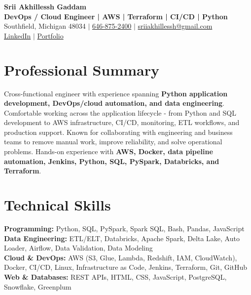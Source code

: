 \documentclass[letterpaper,10pt]{article}
\begin{document}
\fontsize{9.35pt}{10.45pt}\selectfont

\begin{center}
    {\LARGE \textbf{Srii Akhillessh Gaddam}} \\[-1pt]
    \textbf{DevOps / Cloud Engineer | AWS | Terraform | CI/CD | Python} \\[2pt]
    Southfield, Michigan 48034 $|$
    \href{tel:6468752400}{646-875-2400} $|$
    \href{mailto:sriiakhillessh@gmail.com}{sriiakhillessh@gmail.com} \\[1pt]
    \href{https://www.linkedin.com/in/srii-akhiilessh-gaddam-b48668191/}{LinkedIn} $|$
    \href{https://sriiakhillesshg.github.io/portfolio/}{Portfolio}
\end{center}
\vspace{-8pt}

\section{Professional Summary}
\small{Cross-functional engineer with experience spanning \textbf{Python application development, DevOps/cloud automation, and data engineering}. Comfortable working across the application lifecycle - from Python and SQL development to AWS infrastructure, CI/CD, monitoring, ETL workflows, and production support. Known for collaborating with engineering and business teams to remove manual work, improve reliability, and solve operational problems. Hands-on experience with \textbf{AWS, Docker, data pipeline automation, Jenkins, Python, SQL, PySpark, Databricks, and Terraform}.}

\section{Technical Skills}
\small{
\textbf{Programming:} Python, SQL, PySpark, Spark SQL, Bash, Pandas, JavaScript \\
\textbf{Data Engineering:} ETL/ELT, Databricks, Apache Spark, Delta Lake, Auto Loader, Airflow, Data Validation, Data Modeling \\
\textbf{Cloud \& DevOps:} AWS (S3, Glue, Lambda, Redshift, IAM, CloudWatch), Docker, CI/CD, Linux, Infrastructure as Code, Jenkins, Terraform, Git, GitHub \\
\textbf{Web \& Databases:} REST APIs, HTML, CSS, JavaScript, PostgreSQL, Snowflake, Greenplum
}
\end{document}
